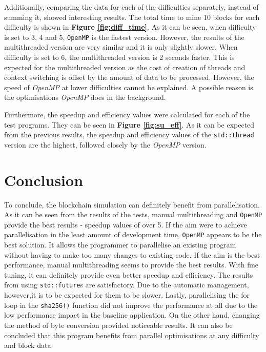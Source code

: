 \documentclass[12pt, a4paper]{article}
\begin{document}
    Additionally, comparing the data for each of the difficulties separately, instead of summing it, showed interesting results. The total time to mine 10 blocks for each difficulty is shown in \textbf{Figure \ref{fig:diff_time}}. As it can be seen, when difficulty is set to 3, 4 and 5, \texttt{OpenMP} is the fastest version. However, the results of the multithreaded version are very similar and it is only slightly slower. When difficulty is set to 6, the multithreaded version is 2 seconds faster. This is expected for the multithreaded version as the cost of creation of threads and context switching is offset by the amount of data to be processed. However, the speed of \textit{OpenMP} at lower difficulties cannot be explained. A possible reason is the optimisations \textit{OpenMP} does in the background.

    Furthermore, the speedup and efficiency values were calculated for each of the test programs. They can be seen in \textbf{Figure \ref{fig:su_eff}}. As it can be expected from the previous results, the speedup and efficiency values of the \texttt{std::thread} version are the highest, followed closely by the \textit{OpenMP} version.

    \section{Conclusion}
    To conclude, the blockchain simulation can definitely benefit from parallelisation. As it can be seen from the results of the tests, manual multithreading and \texttt{OpenMP} provide the best results - speedup values of over 5. If the aim were to achieve parallelisation in the least amount of development time, \texttt{OpenMP} appears to be the best solution. It allows the programmer to parallelise an existing program without having to make too many changes to existing code. If the aim is the best performance, manual multithreading seems to provide the best results. With fine tuning, it can definitely provide even better speedup and efficiency. The results from using \texttt{std::future}s are satisfactory. Due to the automatic management, however,it is to be expected for them to be slower. Lastly, parallelising the for loop in the \texttt{sha256()} function did not improve the performance at all due to the low performance impact in the baseline application. On the other hand, changing the method of byte conversion provided noticeable results. It can also be concluded that this program benefits from parallel optimisations at any difficulty and block data.
\end{document}
